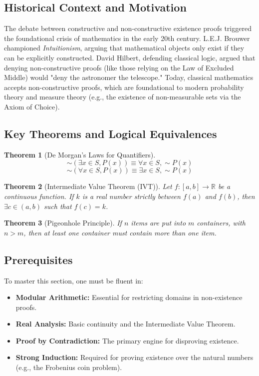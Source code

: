 \documentclass[11pt, a4paper]{article}
\newtheorem{theorem}{Theorem}[section]
\theoremstyle{definition}
\theoremstyle{remark}
\newcommand{\R}{\mathbb{R}}
\begin{document}
\subsection{Historical Context and Motivation}
The debate between constructive and non-constructive existence proofs triggered the foundational crisis of mathematics in the early 20th century. L.E.J. Brouwer championed \textit{Intuitionism}, arguing that mathematical objects only exist if they can be explicitly constructed. David Hilbert, defending classical logic, argued that denying non-constructive proofs (like those relying on the Law of Excluded Middle) would "deny the astronomer the telescope." Today, classical mathematics accepts non-constructive proofs, which are foundational to modern probability theory and measure theory (e.g., the existence of non-measurable sets via the Axiom of Choice).

\subsection{Key Theorems and Logical Equivalences}
\begin{theorem}[De Morgan's Laws for Quantifiers]
    \[ \sim(\exists x \in S, P(x)) \equiv \forall x \in S, \sim P(x) \]
    \[ \sim(\forall x \in S, P(x)) \equiv \exists x \in S, \sim P(x) \]
\end{theorem}

\begin{theorem}[Intermediate Value Theorem (IVT)]
    Let $f: [a, b] \to \R$ be a continuous function. If $k$ is a real number strictly between $f(a)$ and $f(b)$, then $\exists c \in (a, b)$ such that $f(c) = k$.
\end{theorem}

\begin{theorem}[Pigeonhole Principle]
    If $n$ items are put into $m$ containers, with $n > m$, then at least one container must contain more than one item.
\end{theorem}

\subsection{Prerequisites}
To master this section, one must be fluent in:
\begin{itemize}
    \item \textbf{Modular Arithmetic:} Essential for restricting domains in non-existence proofs.
    \item \textbf{Real Analysis:} Basic continuity and the Intermediate Value Theorem.
    \item \textbf{Proof by Contradiction:} The primary engine for disproving existence.
    \item \textbf{Strong Induction:} Required for proving existence over the natural numbers (e.g., the Frobenius coin problem).
\end{itemize}
\end{document}
